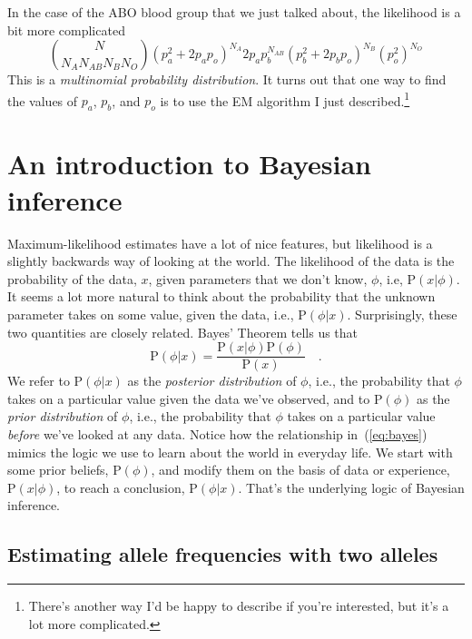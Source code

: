 \documentclass[12pt]{article}
\begin{document}
In the case of the ABO blood group that we just talked about, the
likelihood is a bit more complicated
\begin{equation}
{N \choose N_A N_{AB} N_B N_O}
\left(p_a^2 + 2p_ap_o\right)^{N_A}
2p_ap_b^{N_{AB}}
\left(p_b^2 + 2p_bp_o\right)^{N_B}
\left(p_o^2\right)^{N_O}
\end{equation}
This is a {\it multinomial probability
distribution}. It turns out that one way to find the values of $p_a$,
$p_b$, and $p_o$ is to use the EM algorithm I just
described.\footnote{There's another way I'd be happy to describe if
  you're interested, but it's a lot more complicated.}

\section*{An introduction to Bayesian inference}

Maximum-likelihood estimates have a lot of nice features, but
likelihood is a slightly backwards way of looking at the world. The
likelihood of the data is the probability of the data, $x$, given
parameters that we don't know, $\phi$, i.e, $\mbox{P}(x|\phi)$. It
seems a lot more natural to think about the probability that the
unknown parameter takes on some value, given the data, i.e.,
$\mbox{P}(\phi|x)$. Surprisingly, these two quantities are closely
related. Bayes' Theorem tells us that
\begin{equation}
\mbox{P}(\phi|x) = \frac{\mbox{P}(x|\phi)\mbox{P}(\phi)}{\mbox{P}(x)} \quad .
\label{eq:bayes}
\end{equation}
We refer to $\mbox{P}(\phi|x)$ as the {\it posterior distribution} of
$\phi$, i.e., the probability that $\phi$ takes on a particular value
given the data we've observed, and to $\mbox{P}(\phi)$ as the {\it
  prior distribution} of $\phi$, i.e., the probability that $\phi$
takes on a particular value {\it before\/} we've looked at any
data. Notice how the relationship in~(\ref{eq:bayes}) mimics the logic
we use to learn about the world in everyday life. We start with some
prior beliefs, $\mbox{P}(\phi)$, and modify them on the basis of data
or experience, $\mbox{P}(x|\phi)$, to reach a conclusion,
$\mbox{P}(\phi|x)$. That's the underlying logic of Bayesian
inference.

\subsection*{Estimating allele frequencies with two alleles}
\end{document}
